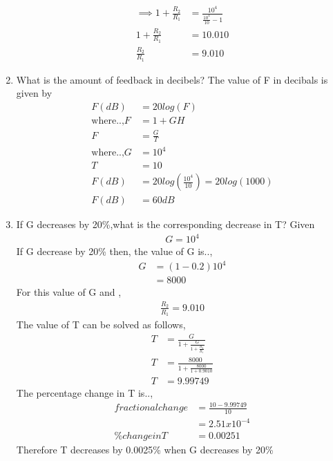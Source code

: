 \begin{enumerate}[label=\thesubsection.\arabic*.,ref=\thesubsection.\theenumi]
\begin{align}
\implies 1+\frac{R_2}{R_1} &= \frac{10^4}{\frac{10^4}{10}-1}
\\
1+\frac{R_2}{R_1} &= 10.010
\\
\frac{R_2}{R_1} &= 9.010
\end{align}
\item What is the amount of feedback in decibels?
\solution The value of F in decibals is given by 
\begin{align}
    F(dB) &= 20log(F)\\
\text{where..,} F &= 1+GH \\
F &= \frac{G}{T}\\
\text{where..,} G&=10^4 \\ T &= 10\\
F(dB) &= 20log(\frac{10^4}{10})=20log(1000)\\
F(dB) &= 60 dB
\end{align}
\item If G decreases by 20\%,what is the corresponding decrease in T?
\solution Given
\begin{align}
G = 10^4
\end{align}
If G decrease by 20\% then,
the value of G is..,
\begin{align}
    G &= (1-0.2)10^4 \\
      &= 8000
\end{align}
For this value of G and ,
\begin{align}
    \frac{R_2}{R_1} = 9.010
\end{align}
The value of T can be solved as follows,
\begin{align}
 T &= \frac{G}{1+\frac{G}{1+\frac{R_2}{R_1}}}\\
 T &= \frac{8000}{1+\frac{8000}{1+0.9010}}\\
 T &= 9.99749
\end{align}
The percentage change in T is..,
\begin{align}
    fractionalchange &= \frac{10-9.99749}{10}\\
      &= 2.51x10^{-4}\\
     \% change in T &= 0.00251
\end{align}
Therefore T decreases by 0.0025\% when G decreases by 20\%
\end{enumerate}

